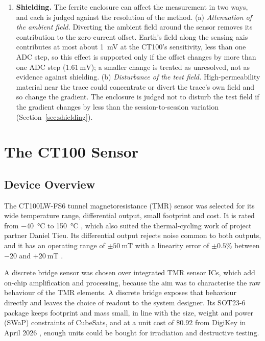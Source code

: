 \documentclass[12pt,a4paper]{article}
\begin{document}
\begin{enumerate}[label=\textbf{H\arabic*:}, leftmargin=*]
\item \textbf{Shielding.} The ferrite enclosure can affect the measurement in two ways, and each is judged against the resolution of the method. (a) \emph{Attenuation of the ambient field.} Diverting the ambient field around the sensor removes its contribution to the zero-current offset. Earth's field along the sensing axis contributes at most about \SI{1}{\milli\volt} at the CT100's sensitivity, less than one ADC step, so this effect is supported only if the offset changes by more than one ADC step ($\SI{1.61}{\milli\volt}$); a smaller change is treated as unresolved, not as evidence against shielding. (b) \emph{Disturbance of the test field.} High-permeability material near the trace could concentrate or divert the trace's own field and so change the gradient. The enclosure is judged not to disturb the test field if the gradient changes by less than the session-to-session variation (Section~\ref{sec:shielding}).
\end{enumerate}

\section{The CT100 Sensor}
\label{sec:ct100}

\subsection{Device Overview}
\label{sec:ct100-overview}

The \mbox{CT100LW-FS6} tunnel magnetoresistance (TMR) sensor was selected for its wide temperature range, differential output, small footprint and cost. It is rated from \SI{-40}{\degreeCelsius} to \SI{150}{\degreeCelsius} \cite{ct100_datasheet}, which also suited the thermal-cycling work of project partner Daniel Tieu. Its differential output rejects noise common to both outputs, and it has an operating range of $\pm\SI{50}{\milli\tesla}$ with a linearity error of $\pm 0.5\%$ between $-20$ and $+\SI{20}{\milli\tesla}$ \cite{ct100_datasheet}.

A discrete bridge sensor was chosen over integrated TMR sensor ICs, which add on-chip amplification and processing, because the aim was to characterise the raw behaviour of the TMR elements. A discrete bridge exposes that behaviour directly and leaves the choice of readout to the system designer. Its SOT23-6 package keeps footprint and mass small, in line with the size, weight and power (SWaP) constraints of CubeSats, and at a unit cost of \$0.92 from DigiKey in April 2026 \cite{digikey_ct100}, enough units could be bought for irradiation and destructive testing.
\end{document}
